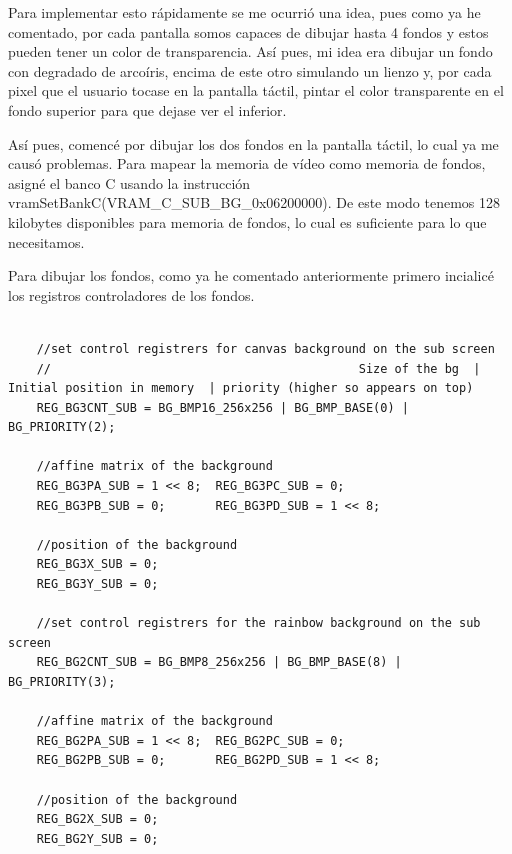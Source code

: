\vspace{0.5cm}

Para implementar esto rápidamente se me ocurrió una idea, pues como ya he comentado, por cada pantalla somos capaces de dibujar hasta 4 fondos y estos pueden tener un color de transparencia. Así pues, mi idea era dibujar un fondo con degradado de arcoíris, encima de este otro simulando un lienzo y, por cada pixel que el usuario tocase en la pantalla táctil, pintar el color transparente en el fondo superior para que dejase ver el inferior.

\vspace{0.5cm}

Así pues, comencé por dibujar los dos fondos en la pantalla táctil, lo cual ya me causó problemas. Para mapear la memoria de vídeo como memoria de fondos, asigné el banco C usando la instrucción vramSetBankC(VRAM\_C\_SUB\_BG\_0x06200000). De este modo tenemos 128 kilobytes disponibles para memoria de fondos, lo cual es suficiente para lo que necesitamos.

\vspace{0.5cm}

Para dibujar los fondos, como ya he comentado anteriormente primero incialicé los registros controladores de los fondos.

\vspace{0.5cm}

\begin{lstlisting}[caption={Configuración de los registros controladores de los fondos de la pantalla inferior}, label={code:subbgconfig}]

    //set control registrers for canvas background on the sub screen
    //                                           Size of the bg  |   Initial position in memory  | priority (higher so appears on top)
    REG_BG3CNT_SUB = BG_BMP16_256x256 | BG_BMP_BASE(0) | BG_PRIORITY(2);

    //affine matrix of the background
    REG_BG3PA_SUB = 1 << 8;  REG_BG3PC_SUB = 0;
    REG_BG3PB_SUB = 0;       REG_BG3PD_SUB = 1 << 8;

    //position of the background
    REG_BG3X_SUB = 0;
    REG_BG3Y_SUB = 0;

    //set control registrers for the rainbow background on the sub screen
    REG_BG2CNT_SUB = BG_BMP8_256x256 | BG_BMP_BASE(8) | BG_PRIORITY(3);

    //affine matrix of the background
    REG_BG2PA_SUB = 1 << 8;  REG_BG2PC_SUB = 0;
    REG_BG2PB_SUB = 0;       REG_BG2PD_SUB = 1 << 8;

    //position of the background
    REG_BG2X_SUB = 0;
    REG_BG2Y_SUB = 0;

\end{lstlisting}

